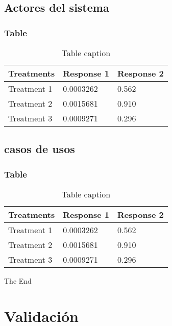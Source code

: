 \documentclass{beamer}
\begin{document}
\subsection{Actores del sistema} 
\begin{frame}
\frametitle{Table}
\begin{table}
\begin{tabular}{l l l}
\toprule
\textbf{Treatments} & \textbf{Response 1} & \textbf{Response 2}\\
\midrule
Treatment 1 & 0.0003262 & 0.562 \\
Treatment 2 & 0.0015681 & 0.910 \\
Treatment 3 & 0.0009271 & 0.296 \\
\bottomrule
\end{tabular}
\caption{Table caption}
\end{table}
\end{frame}

\subsection{casos de usos} 
\begin{frame}
\frametitle{Table}
\begin{table}
\begin{tabular}{l l l}
\toprule
\textbf{Treatments} & \textbf{Response 1} & \textbf{Response 2}\\
\midrule
Treatment 1 & 0.0003262 & 0.562 \\
Treatment 2 & 0.0015681 & 0.910 \\
Treatment 3 & 0.0009271 & 0.296 \\
\bottomrule
\end{tabular}
\caption{Table caption}
\end{table}
\end{frame}







\begin{frame}
\Huge{\centerline{The End}}
\end{frame}




\section{Validación}
\end{document}

